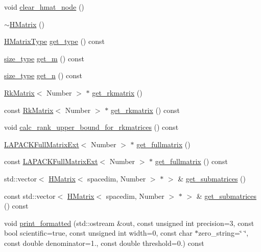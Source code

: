 \begin{DoxyCompactItemize}
\item 
void \hyperlink{classHMatrix_aec0815bc9c3654391bb2b3095383e6cb}{clear\+\_\+hmat\+\_\+node} ()
\item 
\hyperlink{classHMatrix_ae16c956c1b22eb307e9f360a83f4fa75}{$\sim$\+H\+Matrix} ()
\item 
\hyperlink{hmatrix_8h_ac04719e202c88f36e4533fe1d326a494}{H\+Matrix\+Type} \hyperlink{classHMatrix_aadea9fa59f420d22b3b1c939f6b573cc}{get\+\_\+type} () const
\item 
\hyperlink{classHMatrix_a5ca8dc549783d38371a01ecd621ecb34}{size\+\_\+type} \hyperlink{classHMatrix_aabe735f7712a10ba5325ff116f8ca1c7}{get\+\_\+m} () const
\item 
\hyperlink{classHMatrix_a5ca8dc549783d38371a01ecd621ecb34}{size\+\_\+type} \hyperlink{classHMatrix_abff89130116d62ea4159bc69ca11f8d5}{get\+\_\+n} () const
\item 
\hyperlink{classRkMatrix}{Rk\+Matrix}$<$ Number $>$ $\ast$ \hyperlink{classHMatrix_a0189de6e276fbd3425c4a7ef132f5e16}{get\+\_\+rkmatrix} ()
\item 
const \hyperlink{classRkMatrix}{Rk\+Matrix}$<$ Number $>$ $\ast$ \hyperlink{classHMatrix_a64c81db6357d0e00b82fd523af001ae5}{get\+\_\+rkmatrix} () const
\item 
void \hyperlink{classHMatrix_a72191c447afaa0fd84505022cf1d174e}{calc\+\_\+rank\+\_\+upper\+\_\+bound\+\_\+for\+\_\+rkmatrices} () const
\item 
\hyperlink{classLAPACKFullMatrixExt}{L\+A\+P\+A\+C\+K\+Full\+Matrix\+Ext}$<$ Number $>$ $\ast$ \hyperlink{classHMatrix_a9d914c27d4e990d476a4529b2daa64cd}{get\+\_\+fullmatrix} ()
\item 
const \hyperlink{classLAPACKFullMatrixExt}{L\+A\+P\+A\+C\+K\+Full\+Matrix\+Ext}$<$ Number $>$ $\ast$ \hyperlink{classHMatrix_aed550b5b41a64c6f1bbcde4f8f7eca91}{get\+\_\+fullmatrix} () const
\item 
std\+::vector$<$ \hyperlink{classHMatrix}{H\+Matrix}$<$ spacedim, Number $>$ $\ast$ $>$ \& \hyperlink{classHMatrix_a0572b2c0484ce618db0034e3bc7988ed}{get\+\_\+submatrices} ()
\item 
const std\+::vector$<$ \hyperlink{classHMatrix}{H\+Matrix}$<$ spacedim, Number $>$ $\ast$ $>$ \& \hyperlink{classHMatrix_a8f8e9bc437ab86296d78950081ea34cd}{get\+\_\+submatrices} () const
\item 
void \hyperlink{classHMatrix_a7e849f7e8f35e3ebdfcb2dbb7ad4ad01}{print\+\_\+formatted} (std\+::ostream \&out, const unsigned int precision=3, const bool scientific=true, const unsigned int width=0, const char $\ast$zero\+\_\+string=\char`\"{} \char`\"{}, const double denominator=1., const double threshold=0.) const

\end{DoxyCompactItemize}
